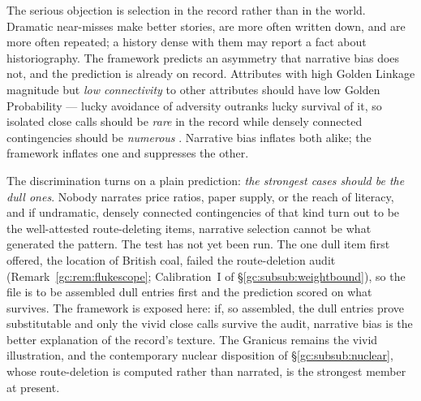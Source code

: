 \begin{remark}\label{gc:rem:narrativebias}
The serious objection is selection in the record rather than in the
world. Dramatic near-misses make better stories, are more often written
down, and are more often repeated; a history dense with them may report
a fact about historiography. The framework predicts an asymmetry that narrative bias does not, and
the prediction is already on record. Attributes with high Golden Linkage
magnitude but \emph{low connectivity} to other attributes should have
low Golden Probability --- lucky avoidance of adversity outranks lucky
survival of it, so isolated close calls should be \emph{rare} in the
record while densely connected contingencies should be
\emph{numerous} \cite{GoldenScience2022}. Narrative bias inflates both
alike; the framework inflates one and suppresses the other.

The discrimination turns on a plain prediction: \emph{the strongest
cases should be the dull ones}. Nobody narrates price ratios, paper
supply, or the reach of literacy, and if undramatic, densely connected
contingencies of that kind turn out to be the well-attested
route-deleting items, narrative selection cannot be what generated the
pattern. The test has not yet been run. The one dull item first
offered, the location of British coal, failed the route-deletion audit
(Remark~\ref{gc:rem:flukescope}; Calibration~I of
\S\ref{gc:subsub:weightbound}), so the file is to be assembled dull
entries first and the prediction scored on what survives. The framework
is exposed here: if, so assembled, the dull entries prove substitutable
and only the vivid close calls survive the audit, narrative bias is the
better explanation of the record's texture. The Granicus remains the
vivid illustration, and the contemporary nuclear disposition of
\S\ref{gc:subsub:nuclear}, whose route-deletion is computed rather than
narrated, is the strongest member at present.
\end{remark}


